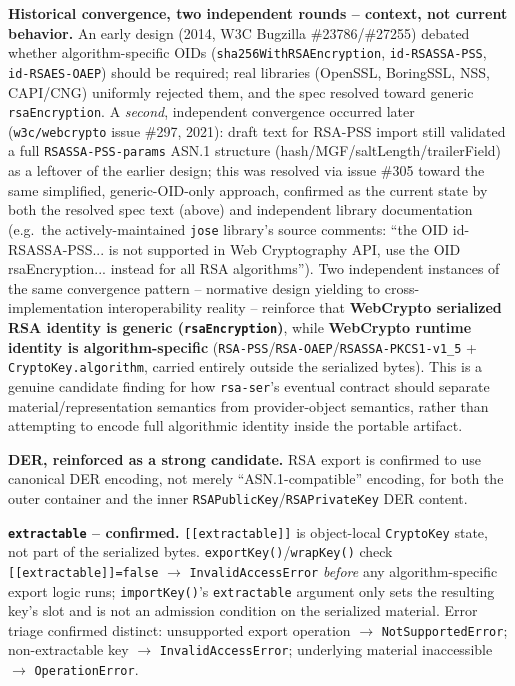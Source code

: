 \documentclass[11pt,a4paper]{article}
\begin{document}
\textbf{Historical convergence, two independent rounds -- context, not current behavior.} An early design (2014, W3C Bugzilla \#23786/\#27255) debated whether algorithm-specific OIDs (\texttt{sha256WithRSAEncryption}, \texttt{id-RSASSA-PSS}, \texttt{id-RSAES-OAEP}) should be required; real libraries (OpenSSL, BoringSSL, NSS, CAPI/CNG) uniformly rejected them, and the spec resolved toward generic \texttt{rsaEncryption}. A \emph{second}, independent convergence occurred later (\texttt{w3c/webcrypto} issue \#297, 2021): draft text for RSA-PSS import still validated a full \texttt{RSASSA-PSS-params} ASN.1 structure (hash/MGF/saltLength/trailerField) as a leftover of the earlier design; this was resolved via issue \#305 toward the same simplified, generic-OID-only approach, confirmed as the current state by both the resolved spec text (above) and independent library documentation (e.g.\ the actively-maintained \texttt{jose} library's source comments: ``the OID id-RSASSA-PSS... is not supported in Web Cryptography API, use the OID rsaEncryption... instead for all RSA algorithms''). Two independent instances of the same convergence pattern -- normative design yielding to cross-implementation interoperability reality -- reinforce that \textbf{WebCrypto serialized RSA identity is generic (\texttt{rsaEncryption})}, while \textbf{WebCrypto runtime identity is algorithm-specific} (\texttt{RSA-PSS}/\texttt{RSA-OAEP}/\texttt{RSASSA-PKCS1-v1\_5} + \texttt{CryptoKey.algorithm}, carried entirely outside the serialized bytes). This is a genuine candidate finding for how \texttt{rsa-ser}'s eventual contract should separate material/representation semantics from provider-object semantics, rather than attempting to encode full algorithmic identity inside the portable artifact.

\textbf{DER, reinforced as a strong candidate.} RSA export is confirmed to use canonical DER encoding, not merely ``ASN.1-compatible'' encoding, for both the outer container and the inner \texttt{RSAPublicKey}/\texttt{RSAPrivateKey} DER content.

\textbf{\texttt{extractable} -- confirmed.} \texttt{[[extractable]]} is object-local \texttt{CryptoKey} state, not part of the serialized bytes. \texttt{exportKey()}/\texttt{wrapKey()} check \texttt{[[extractable]]=false} $\to$ \texttt{InvalidAccessError} \emph{before} any algorithm-specific export logic runs; \texttt{importKey()}'s \texttt{extractable} argument only sets the resulting key's slot and is not an admission condition on the serialized material. Error triage confirmed distinct: unsupported export operation $\to$ \texttt{NotSupportedError}; non-extractable key $\to$ \texttt{InvalidAccessError}; underlying material inaccessible $\to$ \texttt{OperationError}.
\end{document}
